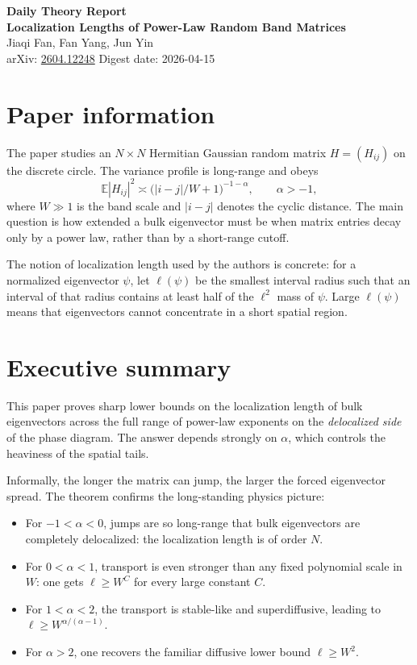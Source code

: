 \documentclass[11pt]{article}
\newcommand{\E}{\mathbb{E}}
\begin{document}
\begin{center}
    {\LARGE \textbf{Daily Theory Report}}\\[0.4em]
    {\Large \textbf{Localization Lengths of Power-Law Random Band Matrices}}\\[0.6em]
    Jiaqi Fan, Fan Yang, Jun Yin\\
    arXiv: \href{https://arxiv.org/abs/2604.12248}{2604.12248} \hspace{1em} Digest date: 2026-04-15
\end{center}

\section*{Paper information}
The paper studies an $N\times N$ Hermitian Gaussian random matrix $H=(H_{ij})$ on the discrete circle. The variance profile is long-range and obeys
\[
\E |H_{ij}|^2 \asymp \bigl(|i-j|/W+1\bigr)^{-1-\alpha}, \qquad \alpha>-1,
\]
where $W\gg 1$ is the band scale and $|i-j|$ denotes the cyclic distance. The main question is how extended a bulk eigenvector must be when matrix entries decay only by a power law, rather than by a short-range cutoff.

The notion of localization length used by the authors is concrete: for a normalized eigenvector $\psi$, let $\ell(\psi)$ be the smallest interval radius such that an interval of that radius contains at least half of the $\ell^2$ mass of $\psi$. Large $\ell(\psi)$ means that eigenvectors cannot concentrate in a short spatial region.

\section*{Executive summary}
This paper proves sharp lower bounds on the localization length of bulk eigenvectors across the full range of power-law exponents on the \emph{delocalized side} of the phase diagram. The answer depends strongly on $\alpha$, which controls the heaviness of the spatial tails.

Informally, the longer the matrix can jump, the larger the forced eigenvector spread. The theorem confirms the long-standing physics picture:
\begin{itemize}[leftmargin=1.5em]
    \item For $-1<\alpha<0$, jumps are so long-range that bulk eigenvectors are completely delocalized: the localization length is of order $N$.
    \item For $0<\alpha<1$, transport is even stronger than any fixed polynomial scale in $W$: one gets $\ell\ge W^C$ for every large constant $C$.
    \item For $1<\alpha<2$, the transport is stable-like and superdiffusive, leading to $\ell\ge W^{\alpha/(\alpha-1)}$.
    \item For $\alpha>2$, one recovers the familiar diffusive lower bound $\ell\ge W^2$.
\end{itemize}
\end{document}

